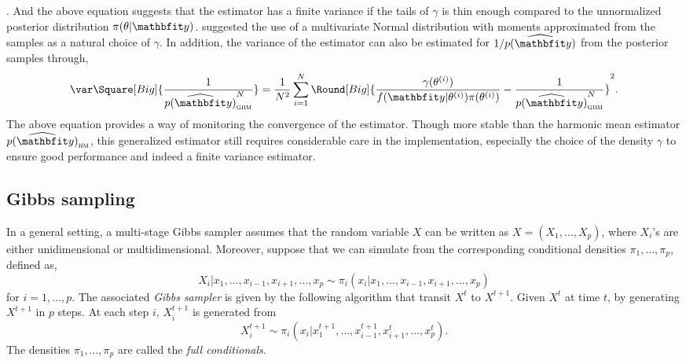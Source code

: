 \cite{Kass:1995vb}. And the above equation suggests that the estimator has a
finite variance if the tails of $\gamma$ is thin enough compared to the
unnormalized posterior distribution $\pi(\theta|\data)$.
\cite{Gelfand:1994ux} suggested the use of a multivariate Normal distribution
with moments approximated from the samples as a natural choice of $\gamma$. In
addition, the variance of the estimator can also be estimated for
$1/\widehat{p(\data)}$ from the posterior samples through,
\begin{equation}
  \var\Square[Big]{\frac{1}{\widehat{p(\data)}_{\text{\textsc{ghm}}}^N}} =
  \frac{1}{N^2}\sum_{i=1}^N \Round[Big]{
    \frac{\gamma(\supi\theta)}{f(\data|\supi\theta)\pi(\supi\theta)}
    - \frac{1}{\widehat{p(\data)}_{\text{\textsc{ghm}}}^N}}^2.
\end{equation}
The above equation provides a way of monitoring the convergence of the
estimator. Though more stable than the harmonic mean estimator
$\widehat{p(\data)}_{\text{\textsc{hm}}}$, this generalized estimator still
requires considerable care in the implementation, especially the choice of the
density $\gamma$ to ensure good performance and indeed a finite variance
estimator.

\subsection{Gibbs sampling}
\label{sub:Gibbs sampling}

In a general setting, a multi-stage Gibbs sampler assumes that the random
variable $X$ can be written as $X = (X_1,\dots,X_p)$, where $X_i$'s are either
unidimensional or multidimensional. Moreover, suppose that we can simulate
from the corresponding conditional densities $\pi_1,\dots,\pi_p$, defined as,
\begin{equation}
  X_i|x_1,\dots,x_{i-1},x_{i+1},\dots,x_p
  \sim \pi_i(x_i|x_1,\dots,x_{i-1},x_{i+1},\dots,x_p)
\end{equation}
for $i = 1,\dots,p$. The associated \emph{Gibbs sampler} is given by the
following algorithm that transit $X^t$ to $X^{t+1}$. Given $X^t$ at time $t$,
by generating $X^{t+1}$ in $p$ steps. At each step $i$, $X_i^{t+1}$ is
generated from
\begin{equation}
  X_i^{t+1} \sim
  \pi_i(x_i|x_1^{t+1},\dots,x_{i-1}^{t+1},x_{i+1}^t,\dots,x_p^t).
\end{equation}
The densities $\pi_1,\dots,\pi_p$ are called the \emph{full conditionals}.

